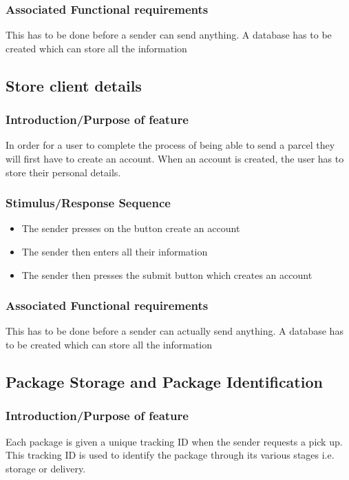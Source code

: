 \documentclass[paper=a4, fontsize=11pt]{scrartcl} %
\numberwithin{equation}{section} %
\numberwithin{figure}{section} %
\numberwithin{table}{section} %
\begin{document}
\subsubsection{Associated Functional requirements}
This has to be done before a sender can send anything. A database has to be created which can store all the information

\subsection{Store client details}
\subsubsection{Introduction/Purpose of feature}
In order for a user to complete the process of being able to send a parcel they will first have to create an account. When an account is created, the user has to store their personal details.
\subsubsection{Stimulus/Response Sequence}
\begin{itemize}
			\item The sender presses on the button create an account
			\item The sender then enters all their information 
			\item The sender then presses the submit button which creates an account 
\end{itemize}
	

\subsubsection{Associated Functional requirements}
This has to be done before a sender can actually send anything. A database has to be created which can store all the information

\subsection{Package Storage and Package Identification}
\subsubsection{Introduction/Purpose of feature}

Each package is given a unique tracking ID when the sender requests a pick up. This tracking ID is used to identify the package through its various stages i.e. storage or delivery.
\end{document}
